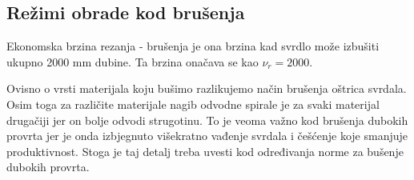 \documentclass[a4paper,12pt]{article}
\numberwithin{figure}{section}
\begin{document}
\subsection{Režimi obrade kod brušenja}
Ekonomska brzina rezanja - brušenja je ona brzina kad svrdlo može izbušiti ukupno 2000 mm dubine. Ta brzina onačava se kao $\nu_{r}=2000$.\par
Ovisno o vrsti materijala koju bušimo razlikujemo način brušenja oštrica svrdala. Osim toga za različite materijale nagib odvodne spirale je za svaki materijal drugačiji jer on bolje odvodi strugotinu. To je veoma važno kod brušenja dubokih provrta jer je onda izbjegnuto višekratno vađenje svrdala i češćenje koje smanjuje produktivnost. Stoga je taj detalj treba uvesti kod određivanja norme za bušenje dubokih provrta.
\begin{table}[!h]
\centering
{}
\end{table}
\end{document}
